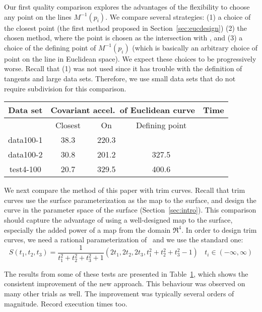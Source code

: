 Our first quality comparison explores the advantages of the flexibility 
to choose any point on the lines $M^{-1}(p_i)$.
We compare several strategies:
(1) a choice of the closest point (the first method proposed in
Section~\ref{sec:eucdesign})
(2) the chosen method, where the point is chosen as the intersection with
, and
(3) a choice of the defining point of $M^{-1}(p_i)$ (which is basically
an arbitrary choice of point on the line in Euclidean space).
We expect these choices to be progressively worse.
Recall that (1) was not used since it has trouble with the definition
of tangents and large data sets.
Therefore, we use small data sets that do not require subdivision
for this comparison.

\begin{table}[h]
\label{tab:cov}
\begin{tabular}{|c|c|c|c|c|}  	\hline
Data set & \multicolumn{3}{c|}{Covariant accel.\ of Euclidean curve} & Time \\ \hline
	 & Closest & On \Sn{3} & Defining point & \\ \hline
data100-1 & 38.3 & 220.3 & &  \\ \hline
data100-2 & 30.8 & 201.2 & 327.5 & \\ \hline
test4-100 & 20.7 & 329.5 & 400.6 & \\ \hline
\end{tabular}
\end{table}

We next compare the method of this paper with trim curves.
Recall that trim curves use the surface parameterization as the map
to the surface, and design the curve in the 
parameter space of the surface (Section~\ref{sec:intro}).
This comparison should capture the advantage of using a well-designed map to the
surface, especially the added power of a map from the domain $\Re^4$.
In order to design trim curves, we need a rational parameterization 
of \ and we use the standard one:
\begin{equation}
\label{Snparam}
	S(t_1,t_2,t_3) = 
	\frac{1}{t_1^2 + t_2^2 + t_3^2 + 1} 
	(2t_1, 2t_2, 2t_3, t_1^2 + t_2^2 + t_3^2 - 1) \ \ \ \ t_i \in (-\infty,\infty)
\end{equation}



The results from some of these tests are presented in Table~\ref{tab:cov},
which shows the consistent improvement of the new approach.
This behaviour was observed on many other trials as well.
The improvement was typically several orders of magnitude.
Record execution times too.

